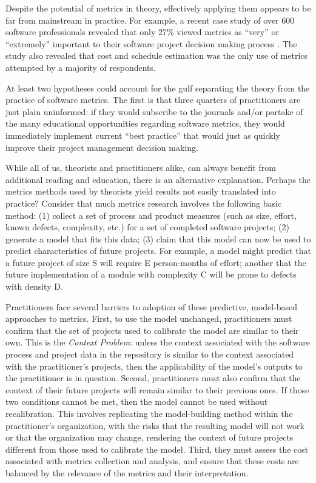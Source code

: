 \documentclass[11pt,twocolumn]{article}
\begin{document}
Despite the potential of metrics in theory, effectively applying them
appears to be far from mainstream in practice. For example, a recent case
study of over 600 software professionals revealed that only 27\% viewed
metrics as ``very'' or ``extremely'' important to their software project
decision making process \cite{Kulik2003}. The study also revealed that cost
and schedule estimation was the only use of metrics attempted
by a majority of respondents.

At least two hypotheses could account for the gulf separating the theory
from the practice of software metrics. The first is that three quarters of
practitioners are just plain uninformed: if they would subscribe to the
journals and/or partake of the many educational opportunities regarding
software metrics, they would immediately implement current ``best
practice'' that would just as quickly improve their project management
decision making.

While all of us, theorists and practitioners alike, can always benefit from
additional reading and education, there is an alternative explanation.
Perhaps the metrics methods used by theorists yield results not easily
translated into practice?  Consider that much metrics research involves the
following basic method: (1) collect a set of process and product
measures (such as size, effort, known defects, complexity, etc.) for a set
of completed software projects; (2) generate a model that fits this data;
(3) claim that this model can now be used to predict characteristics of
future projects. For example, a model might predict that a future project
of size S will require E person-months of effort; another that the future
implementation of a module with complexity C will be prone to defects with
density D. 

Practitioners face several barriers to adoption of these predictive,
model-based approaches to metrics.  First, to use the model unchanged,
practitioners must confirm that the set of projects used to calibrate the
model are similar to their own.  This is the {\em Context Problem}: unless
the context associated with the software process and project data in the
repository is similar to the context associated with the practitioner's
projects, then the applicability of the model's outputs to the practitioner
is in question.  Second, practitioners must also confirm that the context
of their future projects will remain similar to their previous ones.  If
those two conditions cannot be met, then the model cannot be used without
recalibration.  This involves replicating the model-building method
within the practitioner's organization, with the risks that the resulting
model will not work or that the organization may change, rendering the
context of future projects different from those used to calibrate the
model. Third, they must assess the cost associated with metrics collection and analysis, and 
ensure that these costs are balanced by the relevance of the metrics and their interpretation.
\end{document}
